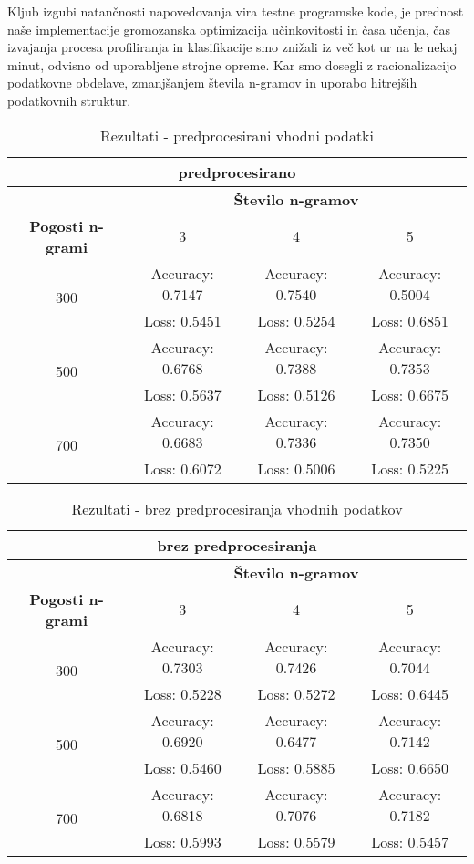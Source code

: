 \documentclass[sigconf,nonacm]{acmart}
\begin{document}
Kljub izgubi natančnosti napovedovanja vira testne programske kode, je prednost naše implementacije gromozanska optimizacija učinkovitosti in časa učenja, čas izvajanja procesa profiliranja in klasifikacije smo znižali iz več kot ur na le nekaj minut, odvisno od uporabljene strojne opreme.
Kar smo dosegli z racionalizacijo podatkovne obdelave, zmanjšanjem števila n-gramov in uporabo hitrejših podatkovnih struktur.

\begin{table}[h!]
	\centering
	\small
	\begin{tabular}{|c|c|c|c|}
		\multicolumn{4}{c}{predprocesirano}\\
		\hline
		& \multicolumn{3}{c}{\textbf{Število n-gramov}}\\
		\hline
		\textbf{Pogosti n-grami} & 3 & 4 & 5\\
		\hline
		\multirow{2}{4em}{300} & Accuracy: 0.7147 & Accuracy: 0.7540 & Accuracy: 0.5004\\
		& Loss: 0.5451 & Loss: 0.5254 & Loss: 0.6851\\
		\hline
		\multirow{2}{4em}{500} & Accuracy: 0.6768 & Accuracy: 0.7388 & Accuracy: 0.7353\\
		& Loss: 0.5637 & Loss: 0.5126 & Loss: 0.6675\\
		\hline
		\multirow{2}{4em}{700} & Accuracy: 0.6683 & Accuracy: 0.7336 & Accuracy: 0.7350\\
		& Loss: 0.6072 & Loss: 0.5006 & Loss: 0.5225\\
		\hline
	\end{tabular}
	\caption{Rezultati - predprocesirani vhodni podatki}
	\label{tab:sample}
\end{table}
\begin{table}[h!]
	\centering
	\small
	\begin{tabular}{|c|c|c|c|}
		\multicolumn{4}{c}{brez predprocesiranja}\\
		\hline
		& \multicolumn{3}{c}{\textbf{Število n-gramov}}\\
		\hline
		\textbf{Pogosti n-grami} & 3 & 4 & 5\\
		\hline
		\multirow{2}{4em}{300} & Accuracy: 0.7303 & Accuracy: 0.7426 & Accuracy: 0.7044\\
		& Loss: 0.5228 & Loss: 0.5272 & Loss: 0.6445\\
		\hline
		\multirow{2}{4em}{500} & Accuracy: 0.6920 & Accuracy: 0.6477 & Accuracy: 0.7142\\
		& Loss: 0.5460 & Loss: 0.5885 & Loss: 0.6650\\
		\hline
		\multirow{2}{4em}{700} & Accuracy: 0.6818 & Accuracy: 0.7076 & Accuracy: 0.7182\\
		& Loss: 0.5993 & Loss: 0.5579 & Loss: 0.5457\\
		\hline
	\end{tabular}
	\caption{Rezultati - brez predprocesiranja vhodnih podatkov}
	\label{tab:sample}
\end{table}
\end{document}
